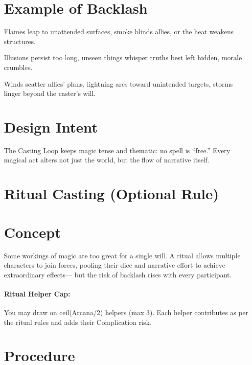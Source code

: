 \documentclass[12pt]{book}
\begin{document}
\section{Example of Backlash}
\begin{description}[leftmargin=2cm]
  \item[Fire] Flames leap to unattended surfaces, smoke blinds allies, or the heat weakens structures.  
  \item[Shadow] Illusions persist too long, unseen things whisper truths best left hidden, morale crumbles.  
  \item[Storm] Winds scatter allies’ plans, lightning arcs toward unintended targets, storms linger beyond the caster’s will.  
\end{description}

\section{Design Intent}
The Casting Loop keeps magic tense and thematic: no spell is “free.”  
Every magical act alters not just the world, but the flow of narrative itself.

\section{Ritual Casting (Optional Rule)}

\section*{Concept}
Some workings of magic are too great for a single will. 
A ritual allows multiple characters to join forces, pooling their dice and narrative effort to achieve extraordinary effects—
but the risk of backlash rises with every participant.  

\paragraph{Ritual Helper Cap:} 
You may draw on ceil(Arcana/2) helpers (max 3).
Each helper contributes as per the ritual rules and adds their Complication risk.

\section*{Procedure}
\end{document}
